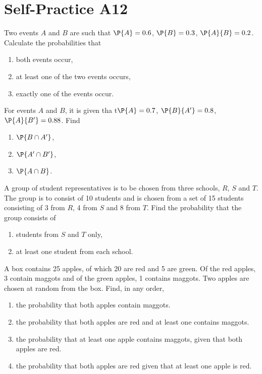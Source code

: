 \section{Self-Practice A12}

\begin{problem}
    Two events $A$ and $B$ are such that $\P{A} = 0.6$, $\P{B} = 0.3$, $\P{A}{B} = 0.2$. Calculate the probabilities that
    \begin{enumerate}
        \item both events occur,
        \item at least one of the two events occurs,
        \item exactly one of the events occur.
    \end{enumerate}
\end{problem}

\begin{problem}
    For events $A$ and $B$, it is given tha t$\P{A} = 0.7$, $\P{B}{A'} = 0.8$, $\P{A}{B'} = 0.88$. Find
    \begin{enumerate}
        \item $\P{B \cap A'}$,
        \item $\P{A' \cap B'}$,
        \item $\P{A \cap B}$.
    \end{enumerate}
\end{problem}

\begin{problem}
    A group of student representatives is to be chosen from three schools, $R$, $S$ and $T$. The group is to consist of 10 students and is chosen from a set of 15 students consisting of 3 from $R$, 4 from $S$ and 8 from $T$. Find the probability that the group consists of
    \begin{enumerate}
        \item students from $S$ and $T$ only,
        \item at least one student from each school.
    \end{enumerate}
\end{problem}

\begin{problem}
    A box contains 25 apples, of which 20 are red and 5 are green. Of the red apples, 3 contain maggots and of the green apples, 1 contains maggots. Two apples are chosen at random from the box. Find, in any order,
    \begin{enumerate}
        \item the probability that both apples contain maggots.
        \item the probability that both apples are red and at least one contains maggots.
        \item the probability that at least one apple contains maggots, given that both apples are red.
        \item the probability that both apples are red given that at least one apple is red.
    \end{enumerate}
\end{problem}

